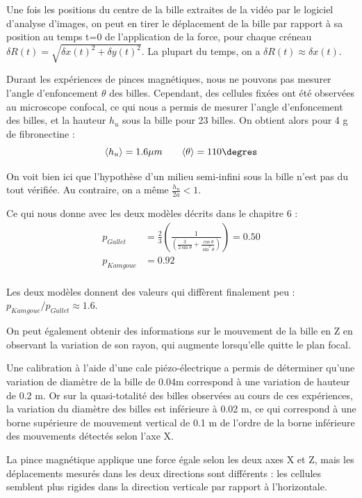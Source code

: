 Une fois les positions du centre de la bille extraites de la vidéo par le logiciel d'analyse d'images, on peut en tirer le déplacement de la bille par rapport à sa position au temps t=0 de l'application de la force, pour chaque créneau $\delta R(t)=\sqrt{\delta x(t)^2+\delta y(t)^2}$. 
La plupart du temps, on a $\delta R(t) \approx \delta x(t)$. 
 
Durant les expériences de pinces magnétiques, nous ne pouvons pas mesurer l'angle d'enfoncement $\theta$ des billes. Cependant, des cellules fixées ont été observées au microscope confocal, ce qui nous a permis de mesurer l'angle d'enfoncement des billes, et la hauteur $h_u$ sous la bille pour 23 billes. On obtient alors pour 4 \micro g de fibronectine : 
$$ \langle h_u \rangle = 1.6 \mu m \qquad \langle \theta \rangle = 110 \degres$$

On voit bien ici que l'hypothèse d'un milieu semi-infini sous la bille n'est pas du tout vérifiée. Au contraire, on a même $\frac{h_u}{2a} <1$. 

Ce qui nous donne avec les deux modèles décrits dans le chapitre 6 : 
\begin{align}
 p_{Gallet}&=\frac{2}{3}\left(\frac{1}{\left( \frac{3}{2 \sin \theta}+\frac{\cos \theta}{\sin^3 \theta}\right)} \right) = 0.50 \\
p_{Kamgoue}&= 0.92\\
\end{align}

Les deux modèles donnent des valeurs qui diffèrent finalement peu : $ p_{Kamgoue} / p_{Gallet} \approx 1.6$.

On peut également obtenir des informations sur le mouvement de la bille en Z en observant la variation de son rayon, qui augmente lorsqu'elle quitte le plan focal. 

Une calibration à l'aide d'une cale piézo-électrique a permis de déterminer qu'une variation de diamètre de la bille de 0.04\micro m correspond à une variation de hauteur de 0.2 \micro m. 
Or sur la quasi-totalité des billes observées au cours de ces expériences, la variation du diamètre des billes est inférieure à 0.02 \micro m, ce qui correspond à une borne supérieure de mouvement vertical de 0.1 \micro m de l'ordre de la borne inférieure des mouvements détectés selon l'axe X. 

La pince magnétique applique une force égale selon les deux axes X et Z, mais les déplacements mesurés dans les deux directions sont différents : les cellules semblent plus rigides dans la direction verticale par rapport à l'horizontale. 

